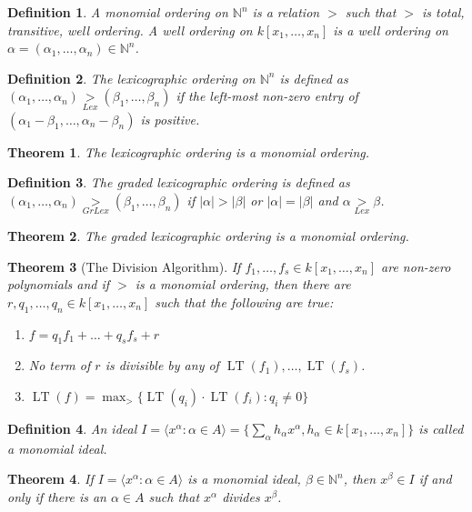 \documentclass{article}
\theoremstyle{mystyle}
\newtheorem{theorem}{Theorem}[section]
\newtheorem{definition}{Definition}[section]
\DeclareMathOperator{\LT}{LT}
\begin{document}
\begin{definition}
A monomial ordering on $\mathbb{N}^n$ is a relation $>$ such that $>$ is total, transitive, well ordering. A well ordering on $k[x_1,\hdots ,x_n]$ is a well ordering on $\alpha = (\alpha_1,\hdots, \alpha_n) \in \mathbb{N}^n$.
\end{definition}
\begin{definition}
The lexicographic ordering on $\mathbb{N}^n$ is defined as $(\alpha_1,\hdots, \alpha_n) \underset{Lex}{>} (\beta_1,\hdots, \beta_n)$ if the left-most non-zero entry of $(\alpha_1-\beta_1,\hdots, \alpha_n-\beta_n)$ is positive.
\end{definition}
\begin{theorem}
The lexicographic ordering is a monomial ordering.
\end{theorem}
\begin{definition}
The graded lexicographic ordering is defined as $(\alpha_1,\hdots, \alpha_n) \underset{GrLex}{>}(\beta_1,\hdots, \beta_n)$ if $|\alpha|>|\beta|$ or $|\alpha| = |\beta|$ and $\alpha \underset{Lex}{>}\beta$.
\end{definition}
\begin{theorem}
The graded lexicographic ordering is a monomial ordering.
\end{theorem}
\begin{theorem}[The Division Algorithm]
If $f_1,\hdots, f_s\in k[x_1,\hdots ,x_n]$ are non-zero polynomials and if $>$ is a monomial ordering, then there are $r,q_1,\hdots, q_n\in k[x_1,\hdots ,x_n]$ such that the following are true:
\begin{enumerate}
\item $f=q_1f_1+\hdots + q_sf_s + r$
\item No term of $r$ is divisible by any of $\LT(f_1),\hdots, \LT(f_s)$.
\item $\LT(f) = \max_{>}\{\LT(q_i)\cdot \LT(f_i):q_i \ne 0\}$
\end{enumerate}
\end{theorem}
\begin{definition}
An ideal $I = \langle x^{\alpha}: \alpha \in A\rangle = \{\sum_{\alpha} h_{\alpha} x^\alpha, h_{\alpha} \in k[x_1,\hdots ,x_n]\}$ is called a monomial ideal.
\end{definition}
\begin{theorem}
If $I = \langle x^\alpha: \alpha \in A\rangle$ is a monomial ideal, $\beta \in \mathbb{N}^n$, then $x^\beta \in I$ if and only if there is an $\alpha \in A$ such that $x^\alpha$ divides $x^\beta$.
\end{theorem}
\end{document}
